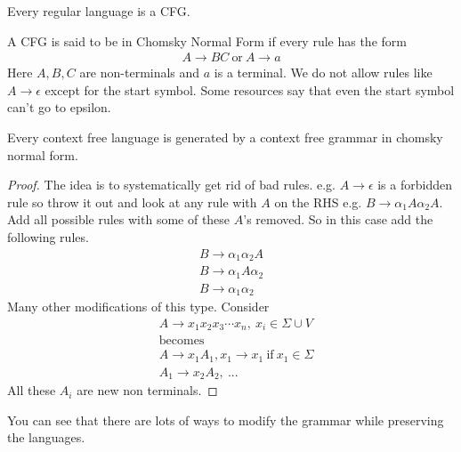 \documentclass[../598comp.tex]{subfiles}
\begin{document}
\begin{fact}
  Every regular language is a CFG.
\end{fact}

\begin{definition}
  A CFG is said to be in Chomsky Normal Form if every rule has the form
  \begin{gather*}
    A \to BC \ \text{or} \ A \to a
  \end{gather*}
  Here $A, B, C$ are non-terminals and $a$ is a terminal. We do not allow rules
  like $A \to \epsilon$ except for the start symbol. Some resources say that
  even the start symbol can't go to epsilon.
\end{definition}

\begin{theorem}
  Every context free language is generated by a context free grammar in chomsky
  normal form.
  \begin{proof}
    The idea is to systematically get rid of bad rules. e.g. $A \to \epsilon$ is
    a forbidden rule so throw it out and look at any rule with $A$ on the RHS
    e.g. $B \to \alpha_1A\alpha_2A$. Add all possible rules with some of these
    $A$'s removed. So in this case add the following rules.
    \begin{gather*}
      B \to \alpha_1\alpha_2A \\
      B \to \alpha_1A\alpha_2 \\
      B \to \alpha_1\alpha_2
    \end{gather*}
    Many other modifications of this type. Consider
    \begin{align*}
      &A \to x_1x_2x_3\cdots x_n, \ x_i \in \Sigma \cup V \\
      &\text{becomes} \\
      &A \to x_1A_1, x_1 \to x_1 \ \text{if} \ x_1 \in \Sigma \\
      &A_1 \to x_2 A_2, \ ...
    \end{align*}
    All these $A_i$ are new non terminals.
  \end{proof}
  You can see that there are lots of ways to modify the grammar while preserving
  the languages.
\end{theorem}
\end{document}
